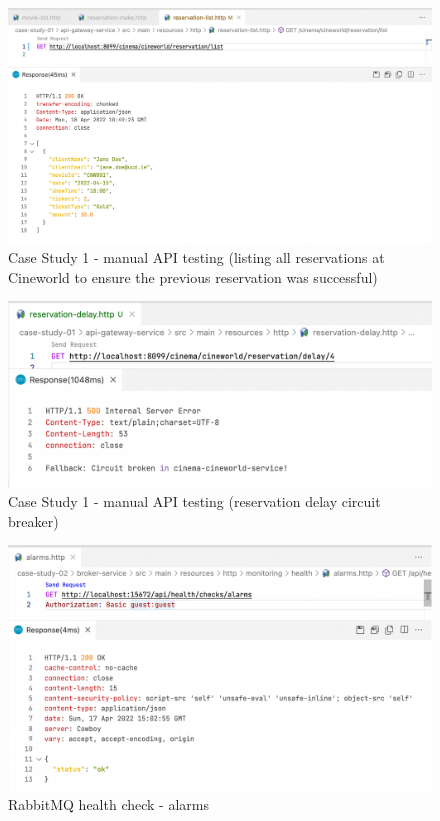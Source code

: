 \begin{figure}[H]
  \centering
  \includegraphics[width=1.0\linewidth]{./assets/images/case-studies/cs01-manual-3.png}
  \caption{Case Study 1 - manual API testing (listing all reservations at Cineworld to ensure the previous reservation was successful)}
  \label{fig:cs01-manual-3}
\end{figure}

\begin{figure}[H]
  \centering
  \includegraphics[width=1.0\linewidth]{./assets/images/case-studies/cs01-manual-4.png}
  \caption{Case Study 1 - manual API testing (reservation delay circuit breaker)}
  \label{fig:cs01-manual-4}
\end{figure}


\begin{figure}[H]
  \centering
  \includegraphics[width=1.0\linewidth]{./assets/images/case-studies/cs02-hc1.png}
  \caption{RabbitMQ health check - alarms}
  \label{fig:cs02-hc1}
\end{figure}

